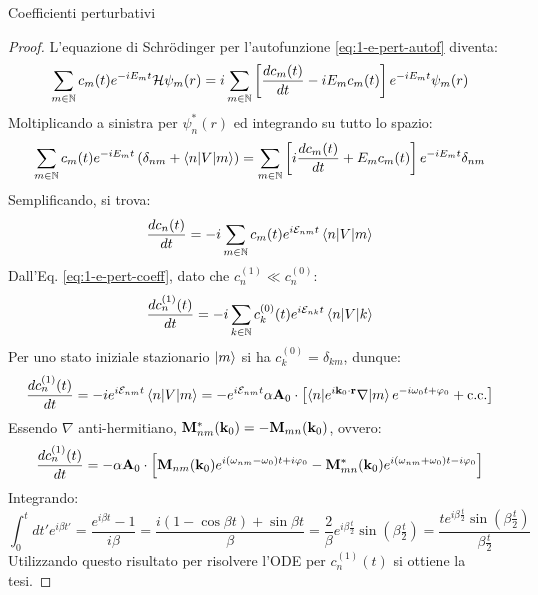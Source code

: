 \begin{proposition}{Coefficienti perturbativi}{}
	\begin{proof}
		L'equazione di Schrödinger per l'autofunzione \ref{eq:1-e-pert-autof} diventa:
		\begin{equation*}
			\sum_{m \in \mathbb{N}} c_m(t) e^{-i E_m t} \mathcal{H} \psi_m(r) = i \sum_{m \in \mathbb{N}} \left[ \frac{dc_m(t)}{dt} - i E_m c_m(t) \right] e^{-i E_m t} \psi_m(r)
		\end{equation*}
		Moltiplicando a sinistra per $ \psi_n^*(r) $ ed integrando su tutto lo spazio:
		\begin{equation*}
			\sum_{m \in \mathbb{N}} c_m(t) e^{-i E_m t} \left( \delta_{nm} + \braket{n | V | m} \right) = \sum_{m \in \mathbb{N}} \left[ i \frac{dc_m(t)}{dt} + E_m c_m(t) \right] e^{-i E_m t} \delta_{nm}
		\end{equation*}
		Semplificando, si trova:
		\begin{equation*}
			\frac{dc_n(t)}{dt} = -i \sum_{m \in \mathbb{N}} c_m(t) e^{i \mathcal{E}_{nm} t} \braket{n | V | m}
		\end{equation*}
		Dall'Eq. \ref{eq:1-e-pert-coeff}, dato che $ c_n^{(1)} \ll c_n^{(0)} $:
		\begin{equation*}
			\frac{dc_n^{(1)}(t)}{dt} = -i \sum_{k \in \mathbb{N}} c_k^{(0)}(t) e^{i \mathcal{E}_{nk} t} \braket{n | V | k}
		\end{equation*}
		Per uno stato iniziale stazionario $ \ket{m} $ si ha $ c_k^{(0)} = \delta_{km} $, dunque:
		\begin{equation*}
			\frac{dc_n^{(1)}(t)}{dt} = -i e^{i \mathcal{E}_{nm} t} \braket{n | V | m} = - e^{i \mathcal{E}_{nm} t} \alpha \mathbf{A}_0 \cdot \left[ \braket{n | e^{i\mathbf{k}_0 \cdot \mathbf{r}} \nabla | m} e^{-i \omega_0 t + \varphi_0} + \text{c.c.} \right]
		\end{equation*}
		Essendo $ \nabla $ anti-hermitiano, $ \mathbf{M}_{nm}^*(\mathbf{k}_0) = - \mathbf{M}_{mn}(\mathbf{k}_0) $, ovvero:
		\begin{equation*}
			\frac{dc_n^{(1)}(t)}{dt} = - \alpha \mathbf{A}_0 \cdot \left[ \mathbf{M}_{nm}(\mathbf{k}_0) e^{i (\omega_{nm} - \omega_0) t + i \varphi_0} - \mathbf{M}_{mn}^*(\mathbf{k}_0) e^{i (\omega_{nm} + \omega_0) t - i \varphi_0} \right]
		\end{equation*}
		Integrando:
		\begin{equation*}
			\int_0^t dt' e^{i \beta t'} = \frac{e^{i\beta t} - 1}{i \beta} = \frac{i (1 - \cos \beta t) + \sin \beta t}{\beta} = \frac{2}{\beta} e^{i \beta \frac{t}{2}} \sin \left( \beta \tfrac{t}{2} \right) = \frac{t e^{i\beta \frac{t}{2}} \sin \left( \beta \frac{t}{2} \right)}{\beta \frac{t}{2}}
		\end{equation*}
		Utilizzando questo risultato per risolvere l'ODE per $ c_n^{(1)}(t) $ si ottiene la tesi.
	\end{proof}
\end{proposition}

